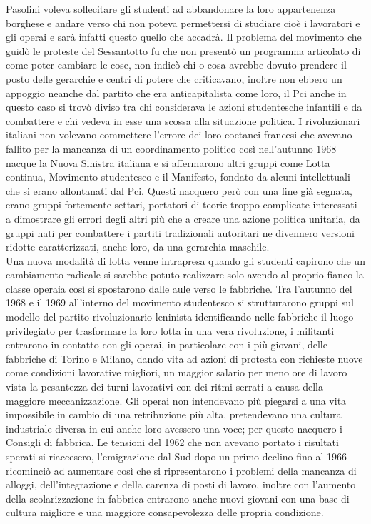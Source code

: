 Pasolini voleva sollecitare gli studenti ad abbandonare la loro appartenenza borghese e andare verso chi non poteva permettersi di studiare cioè i lavoratori e gli operai e sarà infatti questo quello che accadrà.
Il problema del movimento che guidò le proteste del Sessantotto fu che non presentò un programma articolato di come poter cambiare le cose, non indicò chi o cosa avrebbe dovuto prendere il posto delle gerarchie e centri di potere che criticavano, inoltre non ebbero un appoggio neanche dal partito che era anticapitalista come loro, il Pci anche in questo caso si trovò diviso tra chi considerava le azioni studentesche infantili e da combattere e chi vedeva in esse una scossa alla situazione politica.
I rivoluzionari italiani non volevano commettere l'errore dei loro coetanei francesi che avevano fallito per la mancanza di un coordinamento politico così nell'autunno 1968 nacque la Nuova Sinistra italiana e si affermarono altri gruppi come Lotta continua, Movimento studentesco e il Manifesto, fondato da alcuni intellettuali che si erano allontanati dal Pci.
Questi nacquero però con una fine già segnata, erano gruppi fortemente settari, portatori di teorie troppo complicate interessati a dimostrare gli errori degli altri più che a creare una azione politica unitaria, da gruppi nati per combattere i partiti tradizionali autoritari ne divennero versioni ridotte caratterizzati, anche loro, da una gerarchia maschile.
\\Una nuova modalità di lotta venne intrapresa quando gli studenti capirono che un cambiamento radicale si sarebbe potuto realizzare solo avendo al proprio fianco la classe operaia così si spostarono dalle aule verso le fabbriche.
Tra l'autunno del 1968 e il 1969 all'interno del movimento studentesco si strutturarono gruppi sul modello del partito rivoluzionario leninista identificando nelle fabbriche il luogo privilegiato per trasformare la loro lotta in una vera rivoluzione, i militanti entrarono in contatto con gli operai, in particolare con i più giovani, delle fabbriche di Torino e Milano, dando vita ad azioni di protesta con richieste nuove come condizioni lavorative migliori, un maggior salario per meno ore di lavoro vista la pesantezza dei turni lavorativi con dei ritmi serrati a causa della maggiore meccanizzazione.
Gli operai non intendevano più piegarsi a una vita impossibile in cambio di una retribuzione più alta, pretendevano una cultura industriale diversa in cui anche loro avessero una voce; per questo nacquero i Consigli di fabbrica.
Le tensioni del 1962 che non avevano portato i risultati sperati si riaccesero, l'emigrazione dal Sud dopo un primo declino fino al 1966 ricominciò ad aumentare così che si ripresentarono i problemi della mancanza di alloggi, dell'integrazione e della carenza di posti di lavoro, inoltre con l'aumento della scolarizzazione in fabbrica entrarono anche nuovi giovani con una  base di cultura migliore e una maggiore consapevolezza delle propria condizione.
